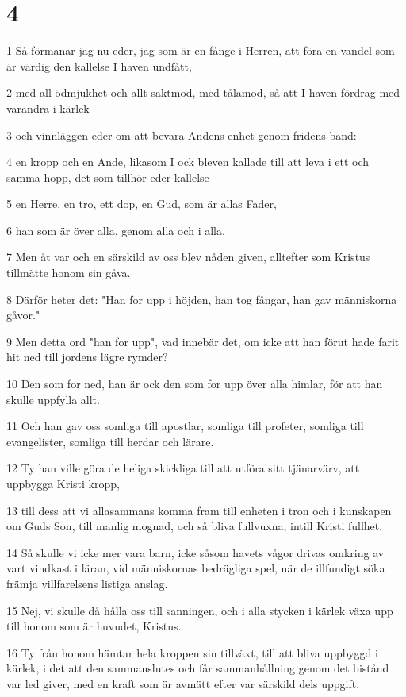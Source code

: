 \chapter{4}

\par 1 Så förmanar jag nu eder, jag som är en fånge i Herren, att föra en vandel som är värdig den kallelse I haven undfått,
\par 2 med all ödmjukhet och allt saktmod, med tålamod, så att I haven fördrag med varandra i kärlek
\par 3 och vinnläggen eder om att bevara Andens enhet genom fridens band:
\par 4 en kropp och en Ande, likasom I ock bleven kallade till att leva i ett och samma hopp, det som tillhör eder kallelse -
\par 5 en Herre, en tro, ett dop, en Gud, som är allas Fader,
\par 6 han som är över alla, genom alla och i alla.
\par 7 Men åt var och en särskild av oss blev nåden given, alltefter som Kristus tillmätte honom sin gåva.
\par 8 Därför heter det: "Han for upp i höjden, han tog fångar, han gav människorna gåvor."
\par 9 Men detta ord "han for upp", vad innebär det, om icke att han förut hade farit hit ned till jordens lägre rymder?
\par 10 Den som for ned, han är ock den som for upp över alla himlar, för att han skulle uppfylla allt.
\par 11 Och han gav oss somliga till apostlar, somliga till profeter, somliga till evangelister, somliga till herdar och lärare.
\par 12 Ty han ville göra de heliga skickliga till att utföra sitt tjänarvärv, att uppbygga Kristi kropp,
\par 13 till dess att vi allasammans komma fram till enheten i tron och i kunskapen om Guds Son, till manlig mognad, och så bliva fullvuxna, intill Kristi fullhet.
\par 14 Så skulle vi icke mer vara barn, icke såsom havets vågor drivas omkring av vart vindkast i läran, vid människornas bedrägliga spel, när de illfundigt söka främja villfarelsens listiga anslag.
\par 15 Nej, vi skulle då hålla oss till sanningen, och i alla stycken i kärlek växa upp till honom som är huvudet, Kristus.
\par 16 Ty från honom hämtar hela kroppen sin tillväxt, till att bliva uppbyggd i kärlek, i det att den sammanslutes och får sammanhållning genom det bistånd var led giver, med en kraft som är avmätt efter var särskild dels uppgift.
